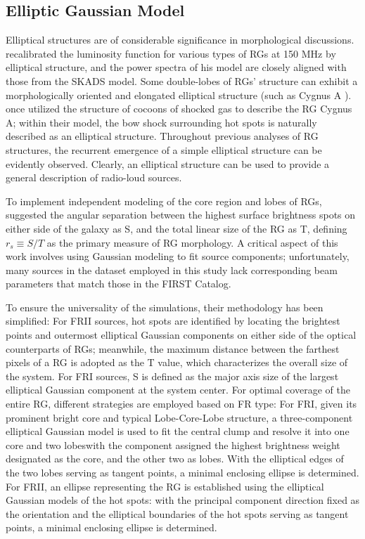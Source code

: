 \documentclass{aa}
\begin{document}
\subsection{Elliptic Gaussian Model}\label{sec:Section3_6}
Elliptical structures are of considerable significance in morphological discussions. \cite{lin_new_2024} recalibrated the luminosity function for various types of RGs at 150 MHz by elliptical structure, and the power spectra of his model are closely aligned with those from the SKADS model. Some double-lobes of RGs' structure can exhibit a morphologically oriented and elongated elliptical structure (such as Cygnus A \citep{carilli_cygnus_1996}). \cite{begelman_overpressured_1989} once utilized the structure of cocoons of shocked gas to describe the RG Cygnus A; within their model, the bow shock surrounding hot spots is naturally described as an elliptical structure. Throughout previous analyses of RG structures, the recurrent emergence of a simple elliptical structure can be evidently observed. Clearly, an elliptical structure can be used to provide a general description of radio-loud sources.

To implement independent modeling of the core region and lobes of RGs, \cite{lin_populations_2010} suggested the angular separation between the highest surface brightness spots on either side of the galaxy as S, and the total linear size of the RG as T, defining $r_s \equiv S/T$ as the primary measure of RG morphology. A critical aspect of this work involves using Gaussian modeling to fit source components; unfortunately, many sources in the dataset employed in this study lack corresponding beam parameters that match those in the FIRST Catalog. 

To ensure the universality of the simulations, their methodology has been simplified: For FRII sources, hot spots are identified by locating the brightest points and outermost elliptical Gaussian components on either side of the optical counterparts of RGs; meanwhile, the maximum distance between the farthest pixels of a RG is adopted as the T value, which characterizes the overall size of the system. For FRI sources, S is defined as the major axis size of the largest elliptical Gaussian component at the system center. For optimal coverage of the entire RG, different strategies are employed based on FR type: For FRI, given its prominent bright core and typical Lobe-Core-Lobe structure, a three-component elliptical Gaussian model is used to fit the central clump and resolve it into one core and two lobes\textemdash with the component assigned the highest brightness weight designated as the core, and the other two as lobes. With the elliptical edges of the two lobes serving as tangent points, a minimal enclosing ellipse is determined. For FRII, an ellipse representing the RG is established using the elliptical Gaussian models of the hot spots: with the principal component direction fixed as the orientation and the elliptical boundaries of the hot spots serving as tangent points, a minimal enclosing ellipse is determined.
\end{document}
